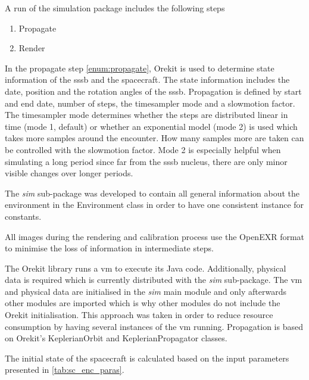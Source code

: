 A run of the simulation package includes the following steps
\begin{enumerate}
    \item Propagate \label{enum:propagate}
    \item Render
\end{enumerate}

In the propagate step \ref{enum:propagate}, Orekit is used to determine state information of the \gls{sssb} and the spacecraft. The state information includes the date, position and the rotation angles of the \gls{sssb}. Propagation is defined by start and end date, number of steps, the timesampler mode and a slowmotion factor.
The timesampler mode determines whether the steps are distributed linear in time (mode 1, default) or whether an exponential model (mode 2) is used which takes more samples around the encounter. How many samples more are taken can be controlled with the slowmotion factor. Mode 2 is especially helpful when simulating a long period since far from the \gls{sssb} nucleus, there are only minor visible changes over longer periods.

The \textit{sim} sub-package was developed to contain all general information about the environment in the Environment class in order to have one consistent instance for constants. 

All images during the rendering and calibration process use the OpenEXR format to minimise the loss of information in intermediate steps.

The Orekit library runs a \gls{vm} to execute its Java code. Additionally, physical data is required which is currently distributed with the \textit{sim} sub-package. The \gls{vm} and physical data are initialised in the \textit{sim} main module and only afterwards other modules are imported which is why other modules do not include the Orekit initialisation. This approach was taken in order to reduce resource consumption by having several instances of the \gls{vm} running. Propagation is based on Orekit's KeplerianOrbit and KeplerianPropagator classes.

The initial state of the spacecraft is calculated based on the input parameters presented in \ref{tab:sc_enc_paras}.

